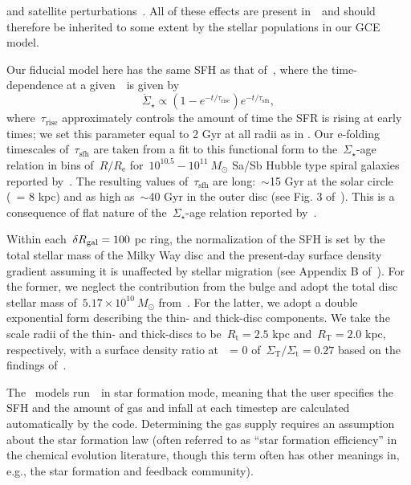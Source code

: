 \documentclass[ms.tex]{subfiles}
\begin{document}
and satellite perturbations~\citep{Bird2012}.
All of these effects are present in~\hsim~and should therefore be inherited to
some extent by the stellar populations in our GCE model.
\par
Our fiducial model here has the same SFH as that of~\citet{Johnson2021}, where
the time-dependence at a given~\rgal~is given by
\begin{equation}
\dot{\Sigma}_\star \propto (1 - e^{-t / \tau_\text{rise}})
e^{-t/\tau_\text{sfh}},
\end{equation}
where~$\tau_\text{rise}$ approximately controls the amount of time the SFR is
rising at early times; we set this parameter equal to 2 Gyr at all radii as in
\citet{Johnson2021}.
Our e-folding timescales of~$\tau_\text{sfh}$ are taken from a fit to this
functional form to the~$\Sigma_\star$-age relation in bins of~$R / R_\text{e}$
for~$10^{10.5} - 10^{11}~M_\odot$ Sa/Sb Hubble type spiral galaxies reported
by~\citet{Sanchez2020}.
The resulting values of~$\tau_\text{sfh}$ are long:~$\sim$15 Gyr at the solar
circle (\rgal~= 8 kpc) and as high as~$\sim$40 Gyr in the outer disc (see Fig.
3 of~\citealp{Johnson2021}).
This is a consequence of flat nature of the~$\Sigma_\star$-age relation
reported by~\citet{Sanchez2020}.
\par
Within each~$\delta R_\text{gal} = 100$ pc ring, the normalization of the SFH is set by
the total stellar mass of the Milky Way disc and the present-day surface
density gradient assuming it is unaffected by stellar migration (see Appendix
B of~\citealp{Johnson2021}).
For the former, we neglect the contribution from the bulge and adopt the total
disc stellar mass of~$5.17\times10^{10}~M_\odot$ from~\citet{Licquia2015}.
For the latter, we adopt a double exponential form describing the thin- and
thick-disc components.
We take the scale radii of the thin- and thick-discs to be~$R_\text{t} = 2.5$
kpc and~$R_\text{T} = 2.0$ kpc, respectively, with a surface density ratio
at~\rgal~= 0 of~$\Sigma_\text{T} / \Sigma_\text{t} = 0.27$ based on the
findings of~\citet{Bland-Hawthorn2016}.
\par
The~\citet{Johnson2021} models run~\vice~in star formation mode, meaning that
the user specifies the SFH and the amount of gas and infall at each timestep
are calculated automatically by the code.
Determining the gas supply requires an assumption about the star formation 
law (often referred to as ``star formation efficiency'' in the chemical
evolution literature, though this term often has other meanings in, e.g., the
star formation and feedback community).
\end{document}
